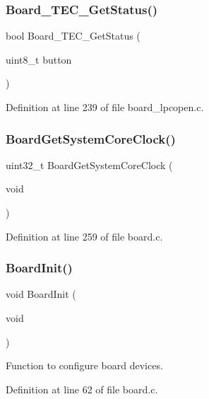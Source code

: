 \subsubsection{\texorpdfstring{Board\+\_\+\+T\+E\+C\+\_\+\+Get\+Status()}{Board\_TEC\_GetStatus()}}
{\footnotesize\ttfamily bool Board\+\_\+\+T\+E\+C\+\_\+\+Get\+Status (\begin{DoxyParamCaption}\item[{uint8\+\_\+t}]{button }\end{DoxyParamCaption})}



Definition at line 239 of file board\+\_\+lpcopen.\+c.

\mbox{\label{group__hal_ga736805438a3d3b44d06eb01ab1932324}} 
\subsubsection{\texorpdfstring{Board\+Get\+System\+Core\+Clock()}{BoardGetSystemCoreClock()}}
{\footnotesize\ttfamily uint32\+\_\+t Board\+Get\+System\+Core\+Clock (\begin{DoxyParamCaption}\item[{void}]{ }\end{DoxyParamCaption})}



Definition at line 259 of file board.\+c.

\mbox{\label{group__hal_gad24575a3bcf2c2433e7720830d813e64}} 
\subsubsection{\texorpdfstring{Board\+Init()}{BoardInit()}}
{\footnotesize\ttfamily void Board\+Init (\begin{DoxyParamCaption}\item[{void}]{ }\end{DoxyParamCaption})}



Function to configure board devices. 



Definition at line 62 of file board.\+c.


